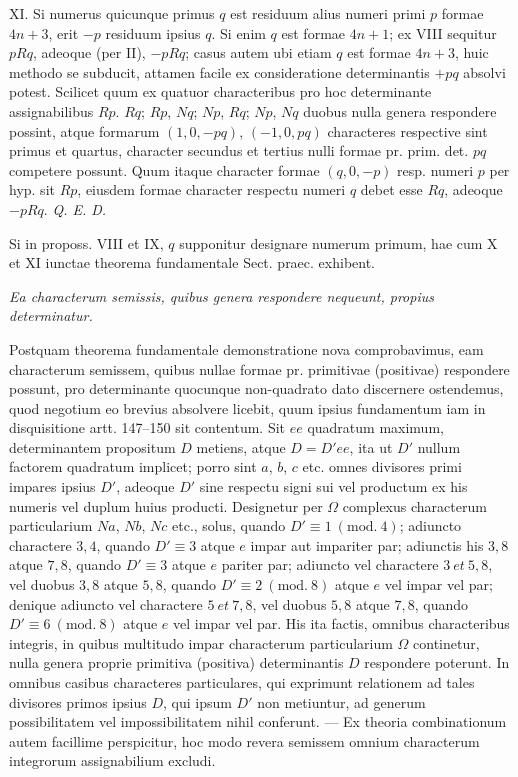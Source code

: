 XI. Si numerus quicunque primus $q$ est residuum alius numeri primi $p$
formae $4n+3$, erit $-p$ residuum ipsius $q$. Si enim $q$ est formae $4n+1$; ex
VIII sequitur $pRq$, adeoque (per II), $-pRq$; casus autem ubi etiam $q$ est formae
$4n+3$, huic methodo se subducit, attamen facile ex consideratione determinantis
$+pq$ absolvi potest. Scilicet quum ex quatuor characteribus pro hoc
determinante assignabilibus $Rp$. $Rq$; $Rp$, $Nq$; $Np$, $Rq$; $Np$, $Nq$ duobus nulla
genera respondere possint, atque formarum $(1,0,-pq)$, $(-1,0,pq)$ characteres
respective sint primus et quartus, character secundus et tertius nulli formae
pr. prim. det. $pq$ competere possunt. Quum itaque character formae $(q,0,-p)$
resp. numeri $p$ per hyp. sit $Rp$, eiusdem formae character respectu numeri $q$
debet esse $Rq$, adeoque $-pRq$. \textit{Q. E. D.}

Si in proposs. VIII et IX, $q$ supponitur designare numerum primum, hae
cum X et XI iunctae theorema fundamentale Sect. praec. exhibent.
\begin{center}
\textit{Ea characterum semissis, quibus genera respondere nequeunt, propius determinatur.}
\end{center}

Postquam theorema fundamentale demonstratione nova comprobavimus, eam
characterum semissem, quibus nullae formae pr. primitivae (positivae) respondere
possunt, pro determinante quocunque non-quadrato dato discernere ostendemus,
quod negotium eo brevius absolvere licebit, quum ipsius fundamentum iam in
disquisitione artt. 147--150 sit contentum. Sit $ee$ quadratum maximum, determinantem
propositum $D$ metiens, atque $D=D'ee$, ita ut $D'$ nullum factorem
quadratum implicet; porro sint $a$, $b$, $c$ etc. omnes divisores primi impares ipsius
$D'$, adeoque $D'$ sine respectu signi sui vel productum ex his numeris vel duplum
huius producti. Designetur per $\Omega$ complexus characterum particularium $Na$, $Nb$,
$Nc$ etc., solus, quando $D'\equiv1\ (\mathrm{mod.}\ 4)$; adiuncto charactere $3,4$, quando $D'\equiv3$
atque $e$ impar aut impariter par; adiunctis his $3,8$ atque $7,8$, quando $D'\equiv3$
atque $e$ pariter par; adiuncto vel charactere $3\ \mathit{et}\ 5,8$, vel duobus $3,8$ atque $5,8$,
quando $D'\equiv2\ (\mathrm{mod.}\ 8)$ atque $e$ vel impar vel par; denique adiuncto vel charactere
$5\ \mathit{et}\ 7,8$, vel duobus $5,8$ atque $7,8$, quando $D'\equiv6\ (\mathrm{mod.}\ 8)$ atque $e$
vel impar vel par. His ita factis, omnibus characteribus integris, in quibus
multitudo impar characterum particularium $\Omega$ continetur, nulla genera proprie
primitiva (positiva) determinantis $D$ respondere poterunt. In omnibus casibus
characteres particulares, qui exprimunt relationem ad tales divisores primos ipsius
$D$, qui ipsum $D'$ non metiuntur, ad generum possibilitatem vel impossibilitatem
nihil conferunt. --- Ex theoria combinationum autem facillime perspicitur,
hoc modo revera semissem omnium characterum integrorum assignabilium excludi.

